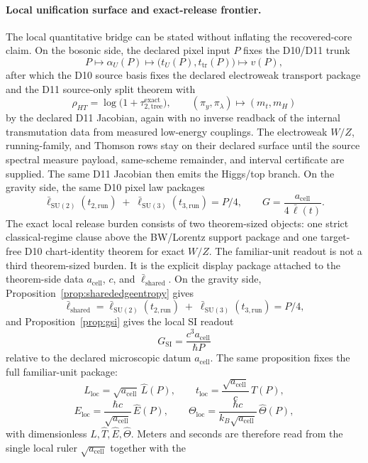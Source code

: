 \documentclass[11pt]{article}
\newcommand{\ellbar}{\bar{\ell}}
\begin{document}
\paragraph{Local unification surface and exact-release frontier.}
The local quantitative bridge can be stated without inflating the recovered-core claim. On the
bosonic side, the declared pixel input \(P\) fixes the D10/D11 trunk
\[
P\longmapsto \alpha_U(P) \longmapsto \bigl(t_U(P),t_{\mathrm{tr}}(P)\bigr)\longmapsto v(P),
\]
after which the D10 source basis fixes the declared electroweak transport package and the D11 source-only split theorem with
\[
\rho_{HT}=\log\!\bigl(1+\tau_{2,\mathrm{tree}}^{\mathrm{exact}}\bigr),
\qquad
(\pi_y,\pi_\lambda)\longmapsto (m_t,m_H)
\]
by the declared D11 Jacobian, again with no inverse readback of the internal transmutation data from measured low-energy couplings. The electroweak \(W/Z\), running-family, and Thomson rows stay on their declared surface until the source spectral measure payload, same-scheme remainder, and interval certificate are supplied. The same D11 Jacobian then emits the Higgs/top branch. On the gravity side, the same D10 pixel law packages
\[
\ellbar_{\mathrm{SU(2)}}(t_{2,\mathrm{run}})
\;+\;
\ellbar_{\mathrm{SU(3)}}(t_{3,\mathrm{run}})
=
P/4,
\qquad
G=\frac{a_{\mathrm{cell}}}{4\,\ellbar(t)}.
\]
The exact local release burden consists of two theorem-sized objects: one strict
classical-regime clause above the BW/Lorentz support package and one target-free D10
chart-identity theorem for exact \(W/Z\). The familiar-unit readout is not a third theorem-sized
burden. It is the explicit display package attached to the theorem-side data
\(a_{\mathrm{cell}}\), \(c\), and \(\ellbar_{\mathrm{shared}}\). On the gravity side,
Proposition~\ref{prop:sharededgeentropy} gives
\[
\ellbar_{\mathrm{shared}}
=
\ellbar_{\mathrm{SU(2)}}(t_{2,\mathrm{run}})
\;+\;
\ellbar_{\mathrm{SU(3)}}(t_{3,\mathrm{run}})
=
P/4,
\]
and Proposition~\ref{prop:gsi} gives the local SI readout
\[
G_{\mathrm{SI}}=\frac{c^3 a_{\mathrm{cell}}}{\hbar P}
\]
relative to the declared microscopic datum \(a_{\mathrm{cell}}\).
The same proposition fixes the full familiar-unit package:
\[
L_{\mathrm{loc}}=\sqrt{a_{\mathrm{cell}}}\,\widehat L(P),\qquad
t_{\mathrm{loc}}=\frac{\sqrt{a_{\mathrm{cell}}}}{c}\,\widehat T(P),
\]
\[
E_{\mathrm{loc}}=\frac{\hbar c}{\sqrt{a_{\mathrm{cell}}}}\,\widehat E(P),\qquad
\Theta_{\mathrm{loc}}=\frac{\hbar c}{k_B\sqrt{a_{\mathrm{cell}}}}\,\widehat\Theta(P),
\]
with dimensionless \(\widehat L,\widehat T,\widehat E,\widehat\Theta\). Meters and seconds are
therefore read from the single local ruler \(\sqrt{a_{\mathrm{cell}}}\) together with the
\end{document}
